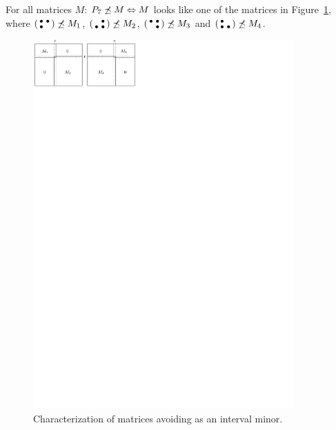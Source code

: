 \begin{thm}
\label{thm:p33}
For all matrices $M$: $P_7\not\preceq M\Leftrightarrow M$ looks like one of the matrices in Figure~\ref{fig:p33}, where $\left(\begin{smallmatrix}\bullet&\bullet\\\bullet& \end{smallmatrix}\right)\not\preceq M_1$, $\left(\begin{smallmatrix} &\bullet\\\bullet&\bullet\end{smallmatrix}\right)\not\preceq M_2$, $\left(\begin{smallmatrix}\bullet&\bullet\\ &\bullet\end{smallmatrix}\right)\not\preceq M_3$ and $\left(\begin{smallmatrix}\bullet& \\\bullet&\bullet\end{smallmatrix}\right)\not\preceq M_4$.
\end{thm}
\begin{figure}[!ht]
\centering
\includegraphics[width=100mm]{img/p33.pdf}
\caption{Characterization of matrices avoiding \usebox{\smlmatb} as an interval minor.}
\label{fig:p33}
\end{figure}
